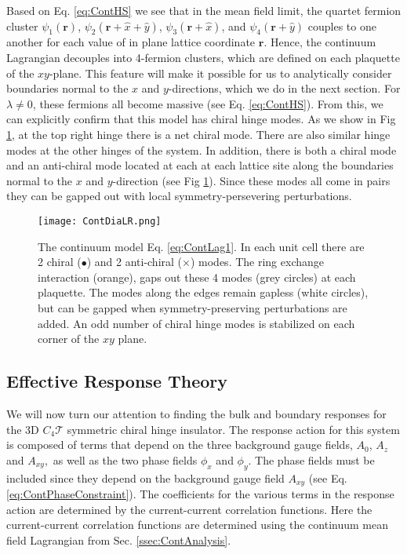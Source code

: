 \documentclass[prb,aps,twocolumn,groupaddress,floatfix]{revtex4-1}
\begin{document}
Based on Eq. \ref{eq:ContHS} we see that in the mean field limit, the quartet fermion cluster $\psi_1(\bm{r})$, $\psi_2(\bm{r}+\hat{x}+\hat{y})$, $\psi_3(\bm{r} + \hat{x})$, and $\psi_4(\bm{r}+\hat{y})$ couples to one another for each value of in plane lattice coordinate ${\bm{r}}.$ Hence, the continuum Lagrangian decouples into 4-fermion clusters, which are defined on each plaquette of the $xy$-plane. This feature will make it possible for us to analytically consider boundaries normal to the $x$ and $y$-directions, which we  do in the next section. For $\lambda \neq 0$, these fermions all become massive (see Eq. \ref{eq:ContHS}). From this, we can explicitly confirm that this model has chiral hinge modes. As we show in Fig \ref{fig:ContinuumDia}, at the top right hinge there is a net chiral mode. There are also similar hinge modes at the other hinges of the system. In addition, there is both a chiral mode and an anti-chiral mode located at each at each lattice site along the boundaries normal to the $x$ and $y$-direction (see Fig \ref{fig:ContinuumDia}). Since these modes all come in pairs they can be gapped out with local symmetry-persevering perturbations. 

\begin{figure}\centering
\texttt{[image: ContDiaLR.png]}
\caption{The continuum model Eq. \ref{eq:ContLag1}. In each unit cell there are 2 chiral ($\bullet$) and 2 anti-chiral ($\times$) modes. The ring exchange interaction (orange), gaps out these 4 modes (grey circles) at each plaquette. The modes along the edges remain gapless (white circles), but can be gapped when symmetry-preserving perturbations are added. An odd number of chiral hinge modes is stabilized on each corner of the $xy$ plane.}\label{fig:ContinuumDia}
\end{figure}



\subsection{Effective Response Theory}\label{ssec:ContEffectiveResponse}
We will now turn our attention to finding the bulk and boundary responses for the $3$D $C_4\mathcal{T}$ symmetric chiral hinge insulator. The response action for this system is composed of terms that depend on the three background gauge fields, $A_0$, $A_z$ and $A_{xy},$ as well as the two phase fields $\phi_x$ and $\phi_y$. The phase fields must be included since they depend on the background gauge field $A_{xy}$ (see Eq. \ref{eq:ContPhaseConstraint}). The coefficients for the various terms in the response action are determined by the current-current correlation functions\cite{fradkin2013}. Here the current-current correlation functions are determined using the continuum mean field Lagrangian from Sec. \ref{ssec:ContAnalysis}.
\end{document}
